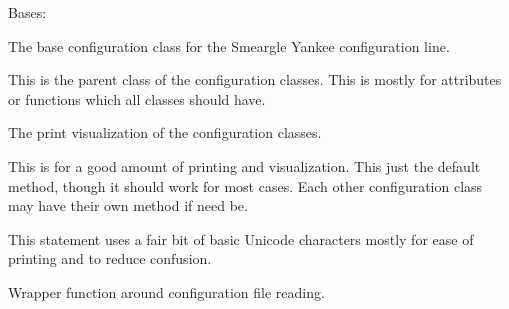 \documentclass[letterpaper,10pt,english]{sphinxmanual}
\begin{document}
\begin{fulllineitems}
\label{\detokenize{python_docstrings/IfA_Smeargle.yankee.configuration_classes.BaseConfig_file:IfA_Smeargle.yankee.configuration_classes.BaseConfig_file.BaseConfig}}
Bases: 

The base configuration class for the Smeargle Yankee configuration
line.

This is the parent class of the configuration classes. This is mostly for
attributes or functions which all classes should have.

\begin{fulllineitems}
\label{\detokenize{python_docstrings/IfA_Smeargle.yankee.configuration_classes.BaseConfig_file:IfA_Smeargle.yankee.configuration_classes.BaseConfig_file.BaseConfig.__str__}}
The print visualization of the configuration classes.

This is for a good amount of printing and visualization. This just
the default method, though it should work for most cases. Each other
configuration class may have their own method if need be.

This statement uses a fair bit of basic Unicode characters mostly
for ease of printing and to reduce confusion.

\end{fulllineitems}


\begin{fulllineitems}
\label{\detokenize{python_docstrings/IfA_Smeargle.yankee.configuration_classes.BaseConfig_file:IfA_Smeargle.yankee.configuration_classes.BaseConfig_file.BaseConfig.read_from_file}}
Wrapper function around configuration file reading.


\end{fulllineitems}
\end{fulllineitems}
\end{document}
